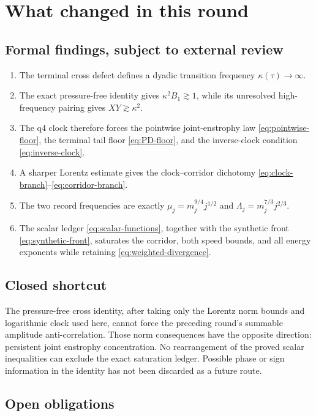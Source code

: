 \documentclass[11pt]{article}
\theoremstyle{remark}
\begin{document}
\section{What changed in this round}

\subsection*{Formal findings, subject to external review}

\begin{enumerate}
\item The terminal cross defect defines a dyadic transition frequency
\(\kappa(\tau)\to\infty\).
\item The exact pressure-free identity gives
\(\kappa^2B_1\gtrsim1\), while its unresolved high-frequency pairing
gives \(XY\gtrsim\kappa^2\).
\item The q4 clock therefore forces the pointwise joint-enstrophy law
\eqref{eq:pointwise-floor}, the terminal tail floor
\eqref{eq:PD-floor}, and the inverse-clock condition
\eqref{eq:inverse-clock}.
\item A sharper Lorentz estimate gives the clock--corridor dichotomy
\eqref{eq:clock-branch}--\eqref{eq:corridor-branch}.
\item The two record frequencies are exactly
\(\mu_j=m_j^{9/4}j^{1/2}\) and
\(\Lambda_j=m_j^{7/3}j^{2/3}\).
\item The scalar ledger \eqref{eq:scalar-functions}, together with the
synthetic front \eqref{eq:synthetic-front}, saturates the corridor, both
speed bounds, and all energy exponents while retaining
\eqref{eq:weighted-divergence}.
\end{enumerate}

\subsection*{Closed shortcut}

The pressure-free cross identity, after taking only the Lorentz norm
bounds and logarithmic clock used here, cannot force the preceding
round's summable amplitude anti-correlation.  Those norm consequences
have the opposite direction: persistent joint enstrophy concentration.
No rearrangement of the proved scalar inequalities can exclude the
exact saturation ledger.  Possible phase or sign information in the
identity has not been discarded as a future route.

\subsection*{Open obligations}
\end{document}
